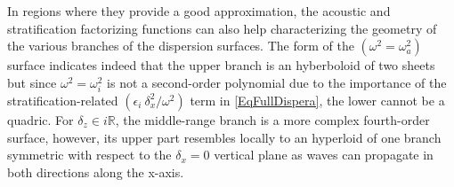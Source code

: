 \documentclass[a4paper,11pt]{article}
\begin{document}
In regions where they provide a good approximation, the acoustic and stratification factorizing functions can also help characterizing the geometry of the various branches of the dispersion surfaces. The form of the $(\omega^2=\omega_a^2)$ surface indicates indeed that the upper branch is an hyberboloid of two sheets but since $\omega^2=\omega_i^2$ is not a second-order polynomial due to the importance of the stratification-related $(\epsilon_i\ \delta_x^2 / \omega^2)$ term in \ref{EqFullDispera}, the lower cannot be a quadric. For $\delta_z\in i\mathbb{R}$, the middle-range branch is a more complex fourth-order surface, however, its upper part resembles locally to an hyperloid of one branch symmetric with respect to the $\delta_x = 0$ vertical plane as waves can propagate in both directions along the x-axis.\\
\end{document}
